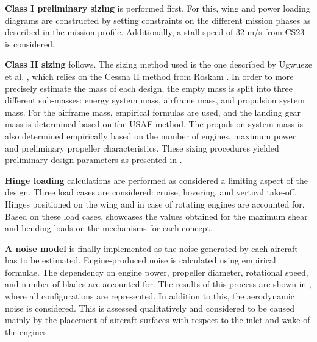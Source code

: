 \textbf{Class I preliminary sizing} is performed first. For this, wing and power loading diagrams are constructed by setting constraints on the different mission phases as described in the mission profile. Additionally, a stall speed of 32 \unit{m/s} from CS23~\cite{easa_cs23_2020} is considered.
   

\textbf{Class II sizing} follows. The sizing method used is the one described by Ugwueze et al. \cite{Ugwueze_Sizing_Method}, which relies on the Cessna II method from Roskam \cite{Roskam_Part_V}.
In order to more precisely estimate the mass of each design, the empty mass is split into three different sub-masses: energy system mass, airframe mass, and propulsion system mass.
For the airframe mass, empirical formulas are used, and the landing gear mass is determined based on the USAF method.
The propulsion system mass is also determined empirically based on the number of engines, maximum power and preliminary propeller characteristics. These sizing procedures yielded preliminary design parameters as presented in .

\textbf{Hinge loading} calculations are performed as considered a limiting aspect of the design. Three load cases are considered: cruise, hovering, and vertical take-off. Hinges positioned on the wing and in case of rotating engines are accounted for. Based on these load cases,  showcases the values obtained for the maximum shear and bending loads on the mechanisms for each concept.

\textbf{A noise model} is finally implemented as the noise generated by each aircraft has to be estimated. Engine-produced noise is calculated using empirical formulae. The dependency on engine power, propeller diameter, rotational speed, and number of blades are accounted for. The results of this process are shown in , where all configurations are represented.
In addition to this, the aerodynamic noise is considered. This is assessed qualitatively and considered to be caused mainly by the placement of aircraft surfaces with respect to the inlet and wake of the engines.

